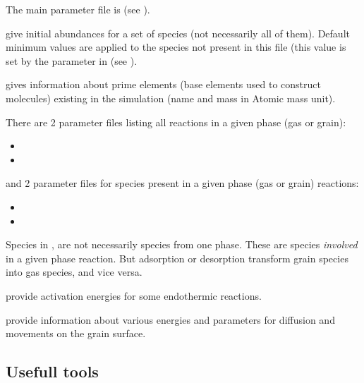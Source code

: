 \documentclass[english,a4paper,twoside]{article}
\begin{document}
The main parameter file is  (see ).

 give initial abundances for a set of species (not necessarily all of them). Default minimum values are applied to the species not present in this file (this value is set by the parameter  in  (see ).

 gives information about prime elements (base elements used to construct molecules) existing in the simulation (name and mass in Atomic mass unit).

There are 2 parameter files listing all reactions in a given phase (gas or grain): 
\begin{itemize}
\item {}
\item {}
\end{itemize}
and 2 parameter files for species present in a given phase (gas or grain) reactions:
\begin{itemize}
\item {}
\item {}
\end{itemize}

\begin{remarque}
Species in ,  are not necessarily species from one phase. These are species \emph{involved} in a given phase reaction. But adsorption or desorption transform grain species into gas species, and vice versa. 
\end{remarque}

 provide activation energies for some endothermic reactions. 

 provide information about various energies and parameters for diffusion and movements on the grain surface.

\subsection{Usefull tools}
\end{document}

